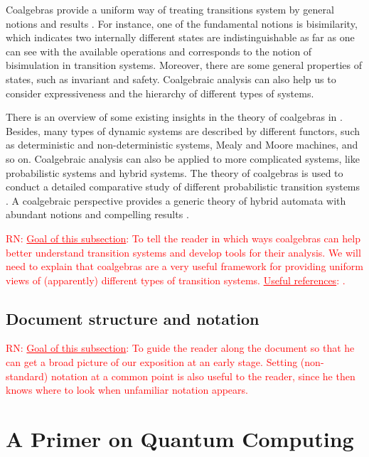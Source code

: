 \documentclass[a4paper, 11pt]{article}
\newcommand{\nevComment}[1]{\textcolor{red}{RN: #1}}
\begin{document}
Coalgebras provide a uniform way of treating transitions system by general notions and results \cite{Jacobs16}. For instance, one of the fundamental notions is bisimilarity, which indicates two internally different states are indistinguishable as far as one can see with the available operations and corresponds to the notion of bisimulation in transition systems. Moreover, there are some general properties of states, such as invariant and safety. Coalgebraic analysis can also help us to consider expressiveness and the hierarchy of different types of systems.

There is an overview of some existing insights in the theory of coalgebras in \cite{rutten2000}. Besides, many types of dynamic systems are described by different functors, such as deterministic and non-deterministic systems, Mealy and Moore machines, and so on.  Coalgebraic analysis can also be applied to more complicated systems, like probabilistic systems and hybrid systems. The theory of coalgebras is used to conduct a detailed comparative study of different probabilistic transition systems \cite{sokolova}.  A coalgebraic perspective provides a generic theory of hybrid automata with abundant notions and compelling results \cite{neves17}. 

\nevComment{\underline{Goal of this subsection}: To tell the reader in
  which ways coalgebras can help better understand transition systems
  and develop tools for their analysis.  We will need to explain that
  coalgebras are a very useful framework for providing
  uniform views of (apparently) different types of transition
  systems. \underline{Useful references}:
  \cite{rutten2000,Jacobs16,sokolova,neves17}. }

\subsection{Document structure and notation}

\nevComment{\underline{Goal of this subsection}: To guide the reader
  along the document so that he can get a broad picture of our
  exposition at an early stage. Setting (non-standard) notation at a
  common point is also useful to the reader, since he then knows where
  to look when unfamiliar notation appears.}

\section{A Primer on Quantum Computing}
\end{document}
